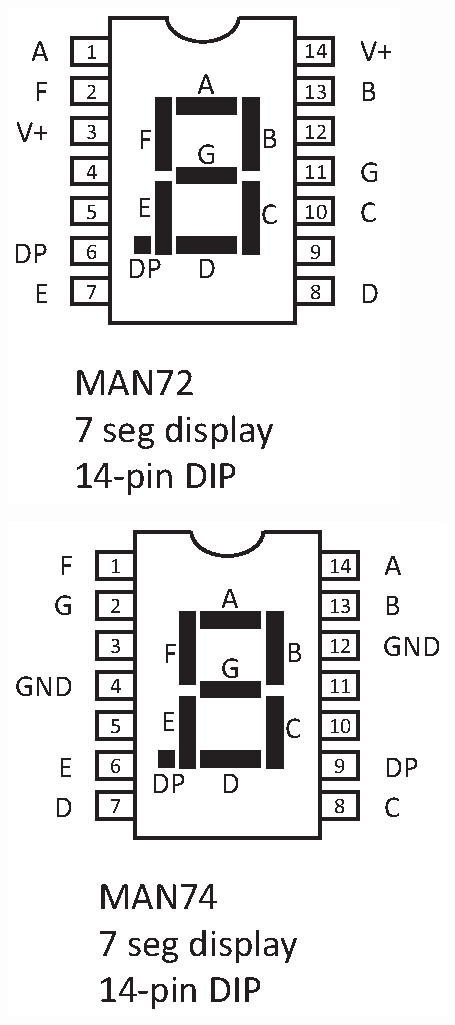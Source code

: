 \includegraphics[scale=0.75]{appendices/pinouts/man72.eps}

\hspace{0.25in}
\includegraphics[scale=0.75]{appendices/pinouts/man74.eps}







